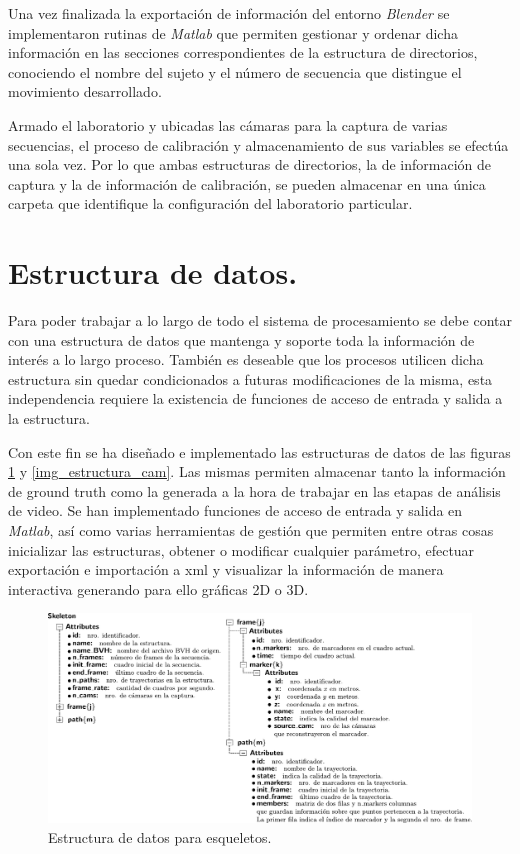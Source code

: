 Una vez finalizada la exportación de información del entorno \textit{Blender} se implementaron rutinas de \textit{Matlab} que permiten gestionar y ordenar dicha información en las secciones correspondientes de la estructura de directorios, conociendo el nombre del sujeto y el número de secuencia que distingue el movimiento desarrollado. 

Armado el laboratorio y ubicadas las cámaras para la captura de varias secuencias, el proceso de calibración y almacenamiento de sus variables se efectúa una sola vez. Por lo que ambas estructuras de directorios, la de información de captura y la de información de calibración,  se pueden almacenar en una única carpeta que identifique la configuración del laboratorio particular.  

\section{Estructura de datos.}
\label{section_Estructura_de_datos}
Para poder trabajar a lo largo de todo el sistema de procesamiento se debe contar con una estructura de datos que mantenga y soporte toda la información de interés a lo largo proceso. También es deseable que los procesos utilicen dicha estructura sin quedar condicionados a futuras modificaciones de la misma, esta independencia requiere la existencia de funciones de acceso de entrada y salida a la estructura.  


Con este fin se ha diseñado e implementado las estructuras de datos de las figuras \ref{img_estructura_skeleton} y \ref{img_estructura_cam}.
Las mismas permiten almacenar tanto la información de ground truth como la generada a la hora de  trabajar en las etapas de análisis de video. Se han implementado funciones de acceso de entrada y salida en \textit{Matlab}, así como varias herramientas de gestión que permiten entre otras cosas inicializar las estructuras, obtener o modificar cualquier parámetro, efectuar exportación e importación a xml y visualizar la información de manera interactiva generando para ello gráficas 2D o 3D. 


\begin{figure}[ht!]
   \hspace{-1.2cm}
   \includegraphics[scale=0.6]{img/Base_Datos/Estructura_datos_skeleton.pdf}
   \caption{Estructura de datos para esqueletos.}  
   \label{img_estructura_skeleton} 
 \end{figure} 

